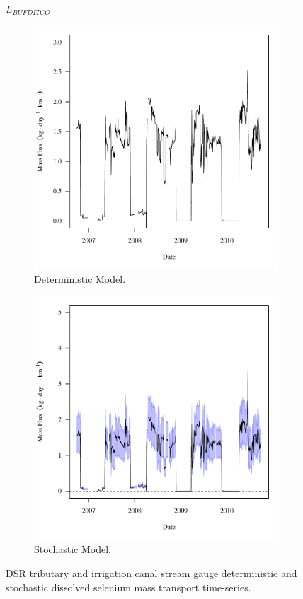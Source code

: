 \subfiguremid
\begin{landscape}
	\begin{figure}
		$ \displaystyle L_{BUFDITCO} $
		\begin{subfigure}{0.7\textwidth}
			\centering
			\includegraphics[width=\tableCustomSize]{"Figures/Results_DSR/Deterministic/f BUF"}
			\caption{Deterministic Model.}
		\end{subfigure}%
		\begin{subfigure}{0.7\textwidth}
			\centering
			\includegraphics[width=\tableCustomSize]{"Figures/Results_DSR/Stochastic/f BUF"}
			\caption{Stochastic Model.}
		\end{subfigure}
		\caption{DSR tributary and irrigation canal stream gauge deterministic and stochastic dissolved selenium mass transport time-series.}
	\end{figure}
\end{landscape}

